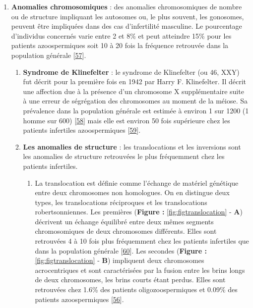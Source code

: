 \documentclass[12pt,a4paper,twoside]{ugathesis}
\providecommand{\tightlist}{%
  \setlength{\itemsep}{0pt}\setlength{\parskip}{0pt}}
\theoremstyle{definition}
\theoremstyle{definition}
\theoremstyle{definition}
\theoremstyle{remark}
\begin{document}
\begin{enumerate}
\def\labelenumi{\arabic{enumi}.}
\setcounter{enumi}{1}
\tightlist
\item
  \textbf{Anomalies chromosomiques} : des anomalies chromosomiques de
  nombre ou de structure impliquant les autosomes ou, le plus souvent,
  les gonosomes, peuvent être impliquées dans des cas d'infertilité
  masculine. Le pourcentage d'individus concernés varie entre 2 et 8\%
  et peut atteindre 15\% pour les patients azoospermiques soit 10 à 20
  fois la fréquence retrouvée dans la population générale
  {[}\protect\hyperlink{ref-Ravel2006}{57}{]}.

  \begin{enumerate}
  \def\labelenumii{\alph{enumii}.}
  \item
    \textbf{Syndrome de Klinefelter} : le syndrome de Klinefelter (ou
    46, XXY) fut décrit pour la première fois en 1942 par Harry F.
    Klinefelter. Il décrit une affection due à la présence d'un
    chromosome X supplémentaire suite à une erreur de ségrégation des
    chromosomes au moment de la méiose. Sa prévalence dans la population
    générale est estimée à environ 1 sur 1200 (1 homme sur 600)
    {[}\protect\hyperlink{ref-Bojesen2011}{58}{]} mais elle est environ
    50 fois supérieure chez les patients infertiles azoospermiques
    {[}\protect\hyperlink{ref-Gekas2001}{59}{]}.
  \item
    \textbf{Les anomalies de structure} : les translocations et les
    inversions sont les anomalies de structure retrouvées le plus
    fréquemment chez les patients infertiles.

    \begin{enumerate}
    \def\labelenumiii{\roman{enumiii}.}
    \tightlist
    \item
      La translocation est définie comme l'échange de matériel génétique
      entre deux chromosomes non homologues. On en distingue deux types,
      les translocations réciproques et les translocations
      robertsonniennes. Les premières (\textbf{Figure :}
      \ref{fig:figtranslocation} - \textbf{A}) décrivent un échange
      équilibré entre deux mêmes segments chromosomiques de deux
      chromosomes différents. Elles sont retrouvées 4 à 10 fois plus
      fréquemment chez les patients infertiles que dans la population
      générale {[}\protect\hyperlink{ref-Elliott1997}{60}{]}. Les
      secondes (\textbf{Figure :} \ref{fig:figtranslocation} -
      \textbf{B}) impliquent deux chromosomes acrocentriques et sont
      caractérisées par la fusion entre les brins longs de deux
      chromosomes, les brins courts étant perdus. Elles sont retrouvées
      chez 1.6\% des patients oligozoospermiques et 0.09\% des patients
      azoospermiques {[}\protect\hyperlink{ref-OFlynnOBrien2010}{56}{]}.
    \end{enumerate}
  \end{enumerate}
\end{enumerate}
\end{document}
